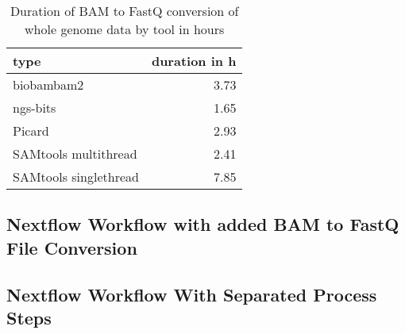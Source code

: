 \begin{table}[H]
\centering
\caption{Duration of BAM to FastQ conversion of whole genome data by tool in hours}
\label{table:bam2fastqdurationgenome}
\small
\begin{tabular}{lr}
\toprule
type & duration in h \\
\midrule
biobambam2 & 3.73 \\
ngs-bits & 1.65 \\
Picard & 2.93 \\
SAMtools multithread & 2.41 \\
SAMtools singlethread & 7.85 \\
\bottomrule
\end{tabular}
\end{table}

\clearpage
\subsection{Nextflow Workflow with added BAM to FastQ File Conversion}\label{appendix:megsapgermlinev02}



\clearpage
\subsection{Nextflow Workflow With Separated Process Steps}\label{appendix:megsapgermlinev03}




